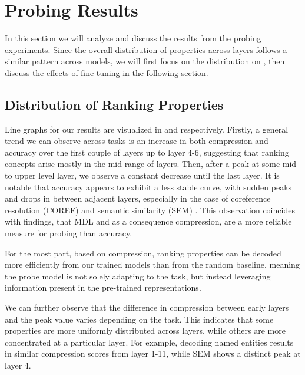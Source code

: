 \chapter{Probing Results}
\label{chap:results}
In this section we will analyze and discuss the results from the probing experiments. Since the overall distribution of properties across layers follows a similar pattern across models, we will first focus on the distribution on , then discuss the effects of fine-tuning in the following section.

\section{Distribution of Ranking Properties}
Line graphs for our results are visualized in  and  respectively. Firstly, a general trend we can observe across tasks is an increase in both compression and accuracy over the first couple of layers up to layer 4-6, suggesting that ranking concepts arise mostly in the mid-range of layers. Then, after a peak at some mid to upper level layer, we observe a constant decrease until the last layer. It is notable that accuracy appears to exhibit a less stable curve, with sudden peaks and drops in between adjacent layers, especially in the case of coreference resolution (COREF) and semantic similarity (SEM) . This observation coincides with \citep{voita-titov-2020-information} findings, that MDL and as a consequence compression, are a more reliable measure for probing than accuracy.

For the most part, based on compression, ranking properties can be decoded more efficiently from our trained models than from the random baseline, meaning the probe model is not solely adapting to the task, but instead leveraging information present in the pre-trained representations.

We can further observe that the difference in compression between early layers and the peak value varies depending on the task. This indicates that some properties are more uniformly distributed across layers, while others are more concentrated at a particular layer. For example, decoding named entities results in similar compression scores from layer 1-11, while SEM shows a distinct peak at layer 4.

